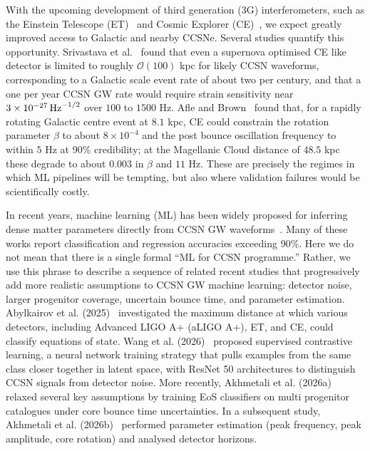 \documentclass[reprint,aps,prd,floatfix,nofootinbib,superscriptaddress,showpacs]{revtex4-2}
\begin{document}
With the upcoming development of third generation (3G) interferometers, such as the Einstein Telescope (ET)~\cite{et_cite} and Cosmic Explorer (CE)~\cite{ce_cite,reitze2019}, we expect greatly improved access to Galactic and nearby CCSNe. Several studies quantify this opportunity. Srivastava et al.~\cite{srivastava2019} found that even a supernova optimised CE like detector is limited to roughly $\mathcal{O}(100)$ kpc for likely CCSN waveforms, corresponding to a Galactic scale event rate of about two per century, and that a one per year CCSN GW rate would require strain sensitivity near $3\times 10^{-27}\,{\rm Hz}^{-1/2}$ over $100$ to $1500$ Hz. Afle and Brown~\cite{afle2020} found that, for a rapidly rotating Galactic centre event at $8.1$ kpc, CE could constrain the rotation parameter $\beta$ to about $8\times 10^{-4}$ and the post bounce oscillation frequency to within $5$ Hz at 90\% credibility; at the Magellanic Cloud distance of $48.5$ kpc these degrade to about $0.003$ in $\beta$ and $11$ Hz. These are precisely the regimes in which ML pipelines will be tempting, but also where validation failures would be scientifically costly.

In recent years, machine learning (ML) has been widely proposed for inferring dense matter parameters directly from CCSN GW waveforms~\cite{mitra2022, mitra2024, abylkairov2024, nunes2024}. Many of these works report classification and regression accuracies exceeding 90\%. Here we do not mean that there is a single formal ``ML for CCSN programme.'' Rather, we use this phrase to describe a sequence of related recent studies that progressively add more realistic assumptions to CCSN GW machine learning: detector noise, larger progenitor coverage, uncertain bounce time, and parameter estimation. Abylkairov et al. (2025)~\cite{abylkairov2025} investigated the maximum distance at which various detectors, including Advanced LIGO A+ (aLIGO A+), ET, and CE, could classify equations of state. Wang et al. (2026)~\cite{wang2026} proposed supervised contrastive learning, a neural network training strategy that pulls examples from the same class closer together in latent space, with ResNet 50 architectures to distinguish CCSN signals from detector noise. More recently, Akhmetali et al. (2026a)~\cite{akhmetali2026a} relaxed several key assumptions by training EoS classifiers on multi progenitor catalogues under core bounce time uncertainties. In a subsequent study, Akhmetali et al. (2026b)~\cite{akhmetali2026b} performed parameter estimation (peak frequency, peak amplitude, core rotation) and analysed detector horizons.
\end{document}
